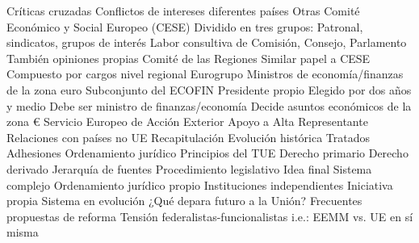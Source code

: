 \documentclass{nuevotema}
\begin{document}
\begin{esquemal}
				\4 Críticas cruzadas
				\4 Conflictos de intereses diferentes países
		\2 Otras
			\3 Comité Económico y Social Europeo (CESE)
				\4 Dividido en tres grupos:
				\4[] Patronal, sindicatos, grupos de interés
				\4 Labor consultiva de Comisión, Consejo, Parlamento
				\4 También opiniones propias
			\3 Comité de las Regiones
				\4 Similar papel a CESE
				\4 Compuesto por cargos nivel regional
			\3 Eurogrupo
				\4 Ministros de economía/finanzas de la zona euro
				\4 Subconjunto del ECOFIN
				\4 Presidente propio
				\4[] Elegido por dos años y medio
				\4[] Debe ser ministro de finanzas/economía
				\4 Decide asuntos económicos de la zona €
			\3 Servicio Europeo de Acción Exterior
				\4 Apoyo a Alta Representante
				\4 Relaciones con países no UE
	\1[] 
		\2 Recapitulación
			\3 Evolución histórica
				\4 Tratados
				\4 Adhesiones
			\3 Ordenamiento jurídico
				\4 Principios del TUE
				\4 Derecho primario
				\4 Derecho derivado
				\4 Jerarquía de fuentes
				\4 Procedimiento legislativo
		\2 Idea final
			\3 Sistema complejo
				\4 Ordenamiento jurídico propio
				\4 Instituciones independientes
				\4 Iniciativa propia
			\3 Sistema en evolución
				\4 ¿Qué depara futuro a la Unión?
				\4 Frecuentes propuestas de reforma
				\4 Tensión federalistas-funcionalistas
				\4[] i.e.: EEMM vs. UE en sí misma
\end{esquemal}
\end{document}
